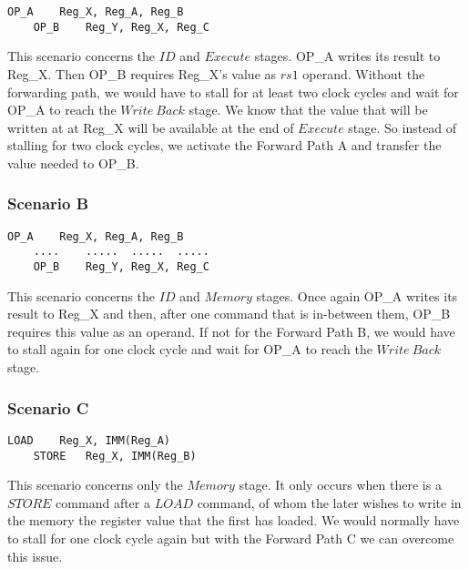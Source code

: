 \begin{lstlisting}[caption={Forward Path A Example},captionpos=b]
	OP_A	Reg_X, Reg_A, Reg_B
	OP_B 	Reg_Y, Reg_X, Reg_C
\end{lstlisting}



This scenario concerns the $ID$ and $Execute$ stages. OP\_A writes its result to Reg\_X. Then OP\_B requires Reg\_X's value as $rs1$ operand. Without the forwarding path, we would have to stall for at least two clock cycles and wait for OP\_A to reach the $Write\ Back$ stage. We know that the value that will be written at at Reg\_X will be available at the end of $Execute$ stage. So instead of stalling for two clock cycles, we activate the Forward Path A and transfer the value needed to OP\_B.

\clearpage

\subsubsection{Scenario B}
\label{3.2.6.2}

\begin{lstlisting}[caption={Forward Path B Example},captionpos=b]
	OP_A	Reg_X, Reg_A, Reg_B
	....	.....  .....  .....
	OP_B 	Reg_Y, Reg_X, Reg_C
\end{lstlisting}

This scenario concerns the $ID$ and $Memory$ stages. Once again OP\_A writes its result to Reg\_X and then, after one command that is in-between them, OP\_B requires this value as an operand. If not for the Forward Path B, we would have to stall again for one clock cycle and wait for OP\_A to reach the $Write\ Back$ stage.

\subsubsection{Scenario C}
\label{3.2.6.3}

\begin{lstlisting}[caption={Forward Path C Example},captionpos=b]
	LOAD 	Reg_X, IMM(Reg_A)
	STORE	Reg_X, IMM(Reg_B)
\end{lstlisting}

This scenario concerns only the $Memory$ stage. It only occurs when there is a $STORE$ command after a $LOAD$ command, of whom the later wishes to write in the memory the register value that the first has loaded. We would normally have to stall for one clock cycle again but with the Forward Path C we can overcome this issue. 

